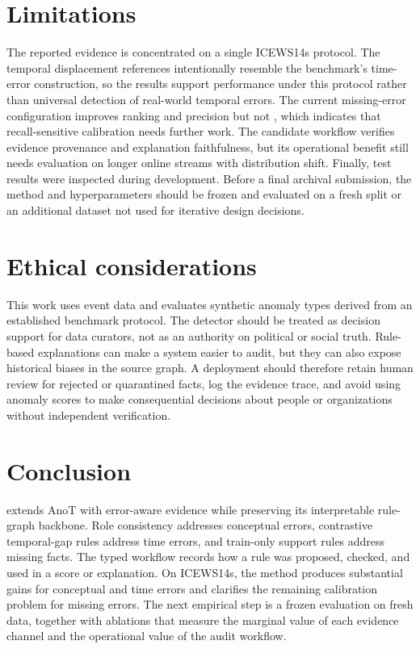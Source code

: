 \section{Limitations}

The reported evidence is concentrated on a single ICEWS14s protocol. The temporal displacement references intentionally resemble the benchmark's time-error construction, so the results support performance under this protocol rather than universal detection of real-world temporal errors. The current missing-error configuration improves ranking and precision but not \fbeta, which indicates that recall-sensitive calibration needs further work. The candidate workflow verifies evidence provenance and explanation faithfulness, but its operational benefit still needs evaluation on longer online streams with distribution shift. Finally, test results were inspected during development. Before a final archival submission, the method and hyperparameters should be frozen and evaluated on a fresh split or an additional dataset not used for iterative design decisions.

\section{Ethical considerations}

This work uses event data and evaluates synthetic anomaly types derived from an established benchmark protocol. The detector should be treated as decision support for data curators, not as an authority on political or social truth. Rule-based explanations can make a system easier to audit, but they can also expose historical biases in the source graph. A deployment should therefore retain human review for rejected or quarantined facts, log the evidence trace, and avoid using anomaly scores to make consequential decisions about people or organizations without independent verification.

\section{Conclusion}

\method extends AnoT with error-aware evidence while preserving its interpretable rule-graph backbone. Role consistency addresses conceptual errors, contrastive temporal-gap rules address time errors, and train-only support rules address missing facts. The typed workflow records how a rule was proposed, checked, and used in a score or explanation. On ICEWS14s, the method produces substantial gains for conceptual and time errors and clarifies the remaining calibration problem for missing errors. The next empirical step is a frozen evaluation on fresh data, together with ablations that measure the marginal value of each evidence channel and the operational value of the audit workflow.

